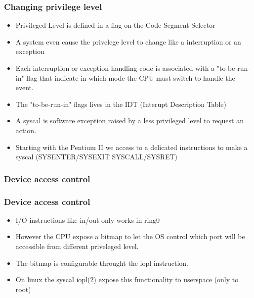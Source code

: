         \begin{frame}
        \frametitle{Changing privilege level}
        \begin{itemize}
                \item Privileged Level is defined in a flag on the Code
                Segment Selector
                \item A system even cause the privelege level to change
                      like a interruption or an exception
                \item Each interruption or exception handling code is
                      associated with a "to-be-run-in" flag that
                      indicate in which mode the CPU must switch to
                      handle the event.
                \item The "to-be-run-in" flags lives in the IDT
                (Interupt Description Table)
                \item A syscal is software exception raised by a less
                      privileged level to request an action.
                \item Starting with the Pentium II we access to a
                      delicated instructions to make a syscal
                      (SYSENTER/SYSEXIT SYSCALL/SYSRET)
        \end{itemize}
        \end{frame}
\subsubsection{Device access control}
        \begin{frame}
        \frametitle{Device access control}
        \begin{itemize}
                \item I/O instructions like in/out only works in ring0
                \item However the CPU expose a bitmap to let the OS
                control which port will be accessible from different
                priveleged level.
                \item The bitmap is configurable throught the iopl
                instruction.
                \item On linux the syscal iopl(2) expose this
                functionality to userspace (only to root)
        \end{itemize}
        \end{frame}

